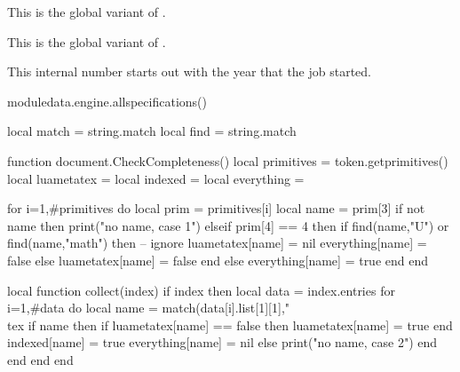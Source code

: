 \startnewprimitive[title={\prm {xtoksapp}}]

This is the global variant of .

\stopnewprimitive

\startnewprimitive[title={\prm {xtokspre}}]

This is the global variant of .

\stopnewprimitive

\startoldprimitive[title={\prm {year}}]

This internal number starts out with the year that the job started.

\stopoldprimitive

\stopsection

\page

\startsection[title=Syntax]

\startpagecolumns[page=no]
    \startluacode
        moduledata.engine.allspecifications()
    \stopluacode
\stoppagecolumns

\stopsection

\page

\startluacode
    local match = string.match
    local find  = string.match

    function document.CheckCompleteness()
        local primitives = token.getprimitives()
        local luametatex = { }
        local indexed    = { }
        local everything = { }

        for i=1,#primitives do
            local prim = primitives[i]
            local name = prim[3]
            if not name then
                print("no name, case 1")
            elseif prim[4] == 4 then
                if find(name,"U") or find(name,"math") then
                    -- ignore
                    luametatex[name] = nil
                    everything[name] = false
                else
                    luametatex[name] = false
                end
            else
                everything[name] = true
            end
        end

        local function collect(index)
            if index then
                local data = index.entries
                for i=1,#data do
                    local name = match(data[i].list[1][1],"\\tex%
                    if name then
                        if luametatex[name] == false then
                            luametatex[name] = true
                        end
                        indexed[name] = true
                        everything[name] = nil
                    else
                        print("no name, case 2")
                    end
                end
            end
        end

